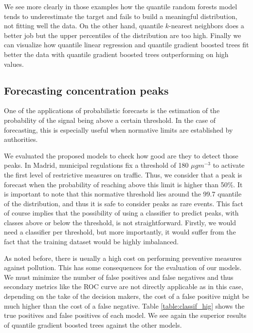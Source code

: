 \documentclass[a4paper,twocolumn,5p]{elsarticle}
\begin{document}
We see more clearly in those examples how the quantile random forests
model tends to underestimate the target and fails to build a
meaningful distribution, not fitting well the data. On the other hand,
quantile $k$-nearest neighbors does a better job but the upper
percentiles of the distribution are too high.  Finally we can
visualize how quantile linear regression and quantile gradient boosted
trees fit better the data with quantile gradient boosted trees
outperforming on high values.

\subsection{Forecasting \no concentration peaks}

One of the applications of probabilistic forecasts is the estimation
of the probability of the signal being above a certain threshold. In
the case of \no forecasting, this is especially useful when normative
limits are established by authorities.

We evaluated the proposed models to check how good are they to detect
those peaks.  In Madrid, municipal regulations fix a threshold of 180
$\mu gm^{-3}$ to activate the first level of restrictive measures on
traffic. Thus, we consider that a \no peak is forecast when the
probability of reaching above this limit is higher than 50\%.  It is
important to note that this normative threshold lies around the 99.7
quantile of the \no distribution, and thus it is safe to consider
peaks as rare events.
This fact of course implies that the possibility of using a classifier
to predict peaks, with classes above or below the threshold, is not
straightforward. Firstly, we would need a classifier per threshold,
but more importantly, it would suffer from the fact that the training
dataset would be highly imbalanced.

As noted before, there is usually a high cost on performing preventive
measures against pollution. This has some consequences for the
evaluation of our models. We must minimize the number of false
positives and false negatives and thus secondary metrics like the ROC
curve are not directly applicable as in this case, depending on the
take of the decision makers, the cost of a false positive might be
much higher than the cost of a false negative. Table
\ref{table:classif_hig} shows the true positives and false positives
of each model. We see again the superior results of quantile gradient
boosted trees against the other models.
\end{document}
